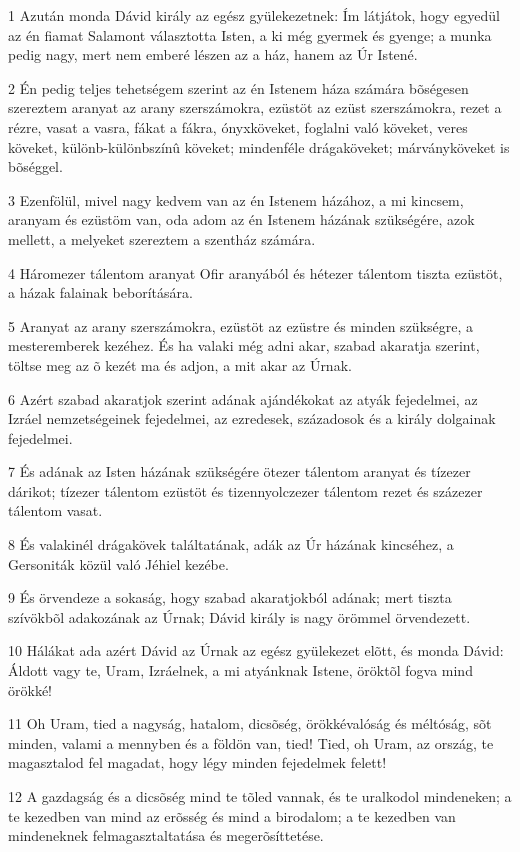 \par 1 Azután monda Dávid király az egész gyülekezetnek: Ím látjátok, hogy egyedül az én fiamat Salamont választotta Isten, a ki még gyermek és gyenge; a munka pedig nagy, mert nem emberé lészen az a ház, hanem az Úr Istené.
\par 2 Én pedig teljes tehetségem szerint az én Istenem háza számára bõségesen szereztem aranyat az arany szerszámokra, ezüstöt az ezüst szerszámokra, rezet a rézre, vasat a vasra, fákat a fákra, ónyxköveket, foglalni való köveket, veres köveket, különb-különbszínû köveket; mindenféle drágaköveket; márványköveket is bõséggel.
\par 3 Ezenfölül, mivel nagy kedvem van az én Istenem házához, a mi kincsem, aranyam és ezüstöm van, oda adom az én Istenem házának szükségére, azok mellett,  a melyeket szereztem a szentház számára.
\par 4 Háromezer tálentom aranyat Ofir aranyából és hétezer tálentom tiszta ezüstöt, a házak falainak beborítására.
\par 5 Aranyat az arany szerszámokra, ezüstöt az ezüstre és minden szükségre, a mesteremberek kezéhez. És ha valaki még adni akar, szabad akaratja szerint, töltse meg az õ kezét ma és adjon, a mit akar az Úrnak.
\par 6 Azért szabad akaratjok szerint adának ajándékokat az atyák fejedelmei, az Izráel nemzetségeinek fejedelmei, az ezredesek, századosok és a király dolgainak fejedelmei.
\par 7 És adának az Isten házának szükségére ötezer tálentom aranyat és tízezer dárikot; tízezer tálentom ezüstöt és tizennyolczezer tálentom rezet és százezer tálentom vasat.
\par 8 És valakinél drágakövek találtatának, adák az Úr házának kincséhez, a Gersoniták közül való Jéhiel kezébe.
\par 9 És örvendeze a sokaság, hogy szabad akaratjokból adának; mert tiszta szívökbõl adakozának az Úrnak; Dávid király is nagy örömmel örvendezett.
\par 10 Hálákat ada azért Dávid az Úrnak az egész gyülekezet elõtt, és monda Dávid: Áldott vagy te, Uram, Izráelnek, a mi atyánknak Istene, öröktõl fogva mind örökké!
\par 11 Oh Uram, tied a nagyság, hatalom, dicsõség, örökkévalóság és méltóság, sõt minden, valami a mennyben és a földön van, tied! Tied, oh Uram, az ország, te magasztalod fel magadat, hogy légy minden fejedelmek felett!
\par 12 A gazdagság és a dicsõség mind te tõled vannak, és te uralkodol mindeneken; a te kezedben van mind az erõsség és mind a birodalom; a te kezedben van mindeneknek felmagasztaltatása és megerõsíttetése.
